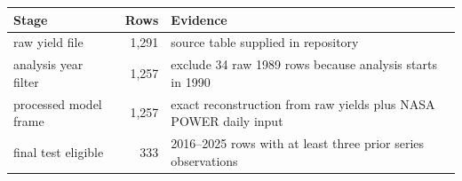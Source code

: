 \begin{tabular}{p{}rp{}}
\toprule
Stage & Rows & Evidence \\
\midrule
raw yield file & 1,291 & source table supplied in repository \\
analysis year filter & 1,257 & exclude 34 raw 1989 rows because analysis starts in 1990 \\
processed model frame & 1,257 & exact reconstruction from raw yields plus NASA POWER daily input \\
final test eligible & 333 & 2016--2025 rows with at least three prior series observations \\
\bottomrule
\end{tabular}
